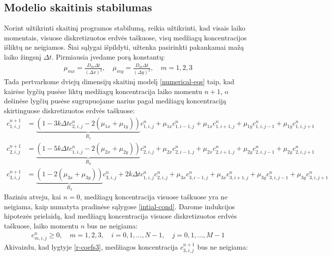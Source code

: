 \subsection{Modelio skaitinis stabilumas}

Norint užtikrinti skaitinį programos stabilumą, reikia užtikrinti, kad visais laiko momentais, visuose diskretizuotos erdvės taškuose, visų medžiagų koncentracijos išliktų ne neigiamos. Šiai sąlygai išpildyti, užtenka pasirinkti pakankamai mažą laiko žingsnį $\Delta t$. Pirmiausia įvedame porą konstantų:
\begin{align*}
\mu_{mx} = \frac{D_m\Delta t}{(\Delta x)^2}, \quad
\mu_{my} = \frac{D_m\Delta t}{(\Delta y)^2}, \quad m = 1, 2, 3
\end{align*}
Tada pertvarkome dviejų dimensijų skaitinį modelį \eqref{numerical-eqs} taip, kad kairėse lygčių pusėse liktų medžiagų koncentracija laiko momentu $n+1$, o dešinėse lygčių pusėse sugrupuojame narius pagal medžiagų koncentraciją skirtinguose diskretizuotos erdvės taškuose:
\begin{subequations} \label{eqs:r-coefs}
  \begin{align}
  c^{n+1}_{1,i,j}&=
  \underbrace{(1-3k\Delta tc^{n}_{2,i,j}-2(\mu_{1x}+\mu_{1y}))}_{R_1}c^n_{1,i,j}
  +\mu_{1x}c^n_{1,i-1,j}+\mu_{1x}c^n_{1,i+1,j}+\mu_{1y}c^n_{1,i,j-1}+\mu_{1y}c^n_{1,i,j+1} \label{r-coefs1}\\
  c^{n+1}_{2,i,j}&=
  \underbrace{(1-5k\Delta tc^{n}_{1,i,j}-2(\mu_{2x}+\mu_{2y}))}_{R_2}c^n_{2,i,j}
  +\mu_{2x}c^n_{2,i-1,j}+\mu_{2x}c^n_{2,i+1,j}+\mu_{2y}c^n_{2,i,j-1}+\mu_{2y}c^n_{2,i,j+1} \label{r-coefs2}\\
  c^{n+1}_{3,i,j}&=
  \underbrace{(1-2(\mu_{3x} + \mu_{3y}))}_{R_3}c^n_{3,i,j}+2k\Delta tc^{n}_{1,i,j}c^{n}_{2,i,j} 
  +\mu_{3x}c^n_{3,i-1,j}+\mu_{3x}c^n_{3,i+1,j}
  +\mu_{3y}c^n_{3,i,j-1}+\mu_{3y}c^n_{3,i,j+1}
  \label{r-coefs3}
  \end{align}
\end{subequations}
Baziniu atveju, kai $n=0$, medžiagų koncentracija visuose taškuose yra ne neigiama, kaip numatyta pradinėse sąlygose \eqref{intial-cond}. Darome indukcijos hipotezės prielaidą, kad medžiagų koncentracija visuose diskretizuotos erdvės taškuose, laiko momentu $n$ bus ne neigiama:
\begin{align} \label{induction-assumption}
  c^n_{m,i,j} \geqslant 0, \quad m=1,2,3,\quad i=0,1,\dots,N-1,\quad j=0,1,\dots,M-1
\end{align}
Akivaizdu, kad lygtyje \eqref{r-coefs3}, medžiagos koncentracija $c^{n+1}_{3,i,j}$ bus ne neigiama:
